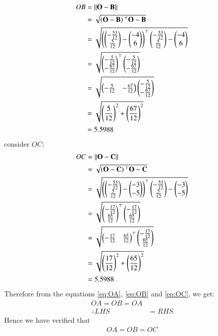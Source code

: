 \documentclass[journal,12pt,twocolumn]{IEEEtran}
\theoremstyle{remark}
\begin{document}
\begin{align} 
OB &= \left\lVert\mathbf{O} - \mathbf{B}\right\rVert\\
&= \sqrt{\left(\mathbf{O}-\mathbf{B}\right){^\top}\mathbf{O}-\mathbf{B}}\\
&= \sqrt{\left(\begin{pmatrix}-\frac{53}{12} \\ \frac{5}{12}\end{pmatrix} - \begin{pmatrix}-4\\6\end{pmatrix}\right)^{\top}\begin{pmatrix}-\frac{53}{12}\\\frac{5}{12}\end{pmatrix} - \begin{pmatrix}-4\\6\end{pmatrix}}\\
&= \sqrt{\begin{pmatrix}-\frac{5}{12} \\ -\frac{67}{12}\end{pmatrix}^{\top}\begin{pmatrix}-\frac{5}{12} \\ -\frac{67}{12}\end{pmatrix}}\\
&= \sqrt{\begin{pmatrix}-\frac{5}{12} & -\frac{67}{12}\end{pmatrix} \begin{pmatrix}-\frac{5}{12} \\ -\frac{67}{12}\end{pmatrix}}\\
&= \sqrt{\left(\frac{5}{12}\right)^2 + \left(\frac{67}{12}\right)^2}\\
&= 5.5988 \label{eq:OB}
\end{align}
consider $OC$:
\begin{align} 
OC &= \left\lVert\mathbf{O} - \mathbf{C}\right\rVert\\
&= \sqrt{\left(\mathbf{O}-\mathbf{C}\right){^\top}\mathbf{O}-\mathbf{C}}\\
&= \sqrt{\left(\begin{pmatrix}-\frac{53}{12} \\ \frac{5}{12}\end{pmatrix} - \begin{pmatrix}-3\\-5\end{pmatrix}\right)^{\top}\begin{pmatrix}-\frac{53}{12}\\\frac{5}{12}\end{pmatrix} - \begin{pmatrix}-3\\-5\end{pmatrix}}\\
&= \sqrt{\begin{pmatrix}-\frac{17}{12} \\ \frac{65}{12}\end{pmatrix}^{\top}\begin{pmatrix}-\frac{17}{12} \\ \frac{65}{12}\end{pmatrix}}\\
&= \sqrt{\begin{pmatrix}-\frac{17}{12} & \frac{65}{12}\end{pmatrix}^{\top}\begin{pmatrix}-\frac{17}{12} \\ \frac{65}{12}\end{pmatrix}}\\
&= \sqrt{\left(\frac{17}{12}\right)^2 + \left(\frac{65}{12}\right)^2}\\
&= 5.5988 \label{eq:OC}
\end{align}
Therefore from the equations \eqref{eq:OA}, \eqref{eq:OB} and \eqref{eq:OC}, we get:
\begin{align}
OA = OB = OA\\
\therefore LHS &= RHS
\end{align}
Hence we have verified that \begin{align} OA = OB = OC \end{align}
\end{document}
